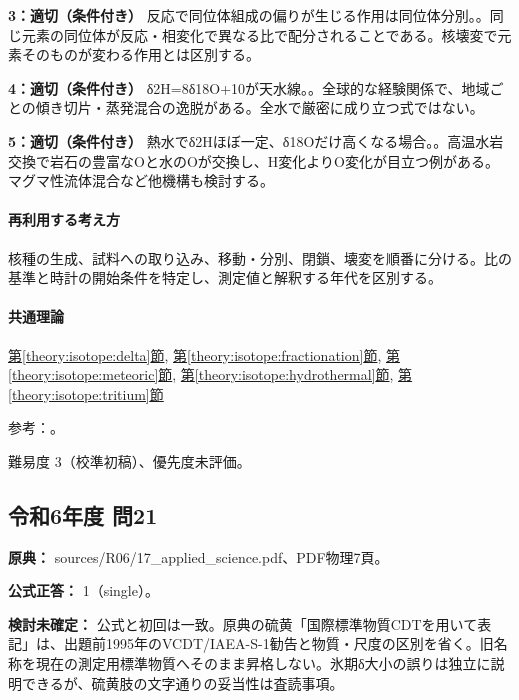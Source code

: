 \noindent\textbf{3：適切（条件付き）} 反応で同位体組成の偏りが生じる作用は同位体分別。。同じ元素の同位体が反応・相変化で異なる比で配分されることである。核壊変で元素そのものが変わる作用とは区別する。\par

\noindent\textbf{4：適切（条件付き）} δ2H=\allowbreak{}8δ18O+10が天水線。。全球的な経験関係で、地域ごとの傾き切片・蒸発混合の逸脱がある。全水で厳密に成り立つ式ではない。\par

\noindent\textbf{5：適切（条件付き）} 熱水でδ2Hほぼ一定、δ18Oだけ高くなる場合。。高温水岩交換で岩石の豊富なOと水のOが交換し、H変化よりO変化が目立つ例がある。マグマ性流体混合など他機構も検討する。\par

\paragraph{再利用する考え方} 核種の生成、試料への取り込み、移動・分別、閉鎖、壊変を順番に分ける。比の基準と時計の開始条件を特定し、測定値と解釈する年代を区別する。

\paragraph{共通理論} \hyperref[theory:isotope:delta]{第\ref*{theory:isotope:delta}節}, \hyperref[theory:isotope:fractionation]{第\ref*{theory:isotope:fractionation}節}, \hyperref[theory:isotope:meteoric]{第\ref*{theory:isotope:meteoric}節}, \hyperref[theory:isotope:hydrothermal]{第\ref*{theory:isotope:hydrothermal}節}, \hyperref[theory:isotope:tritium]{第\ref*{theory:isotope:tritium}節}

\par 参考：\cite{iso_tritium2023,iso_vsmow2,gc_meteoric,iso_hydrothermal}。

\par 難易度 3（校準初稿）、優先度未評価。

\subsection{令和6年度 問21}
\label{q:r06-reg-applied-21}

\noindent\textbf{原典：} sources/R06/17\_applied\_science.pdf、PDF物理7頁。

\textbf{公式正答：} 1（single）。

\par\textbf{検討未確定：} 公式と初回は一致。原典の硫黄「国際標準物質CDTを用いて表記」は、出題前1995年のVCDT/IAEA-S-1勧告と物質・尺度の区別を省く。旧名称を現在の測定用標準物質へそのまま昇格しない。氷期δ大小の誤りは独立に説明できるが、硫黄肢の文字通りの妥当性は査読事項。

